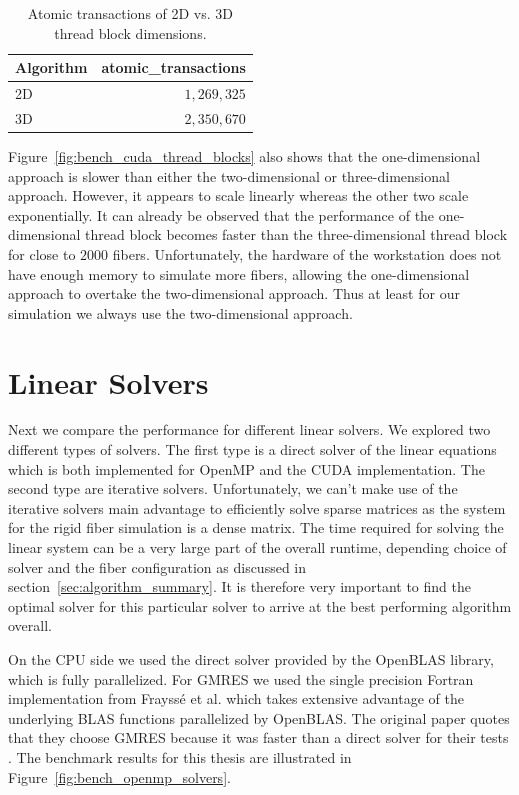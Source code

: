 \documentclass[a4paper,11pt]{kth-mag}
\begin{document}
\begin{table}[!htbp]
  \begin{center}
    \begin{tabulary}{0.7\textwidth}{LR}
      \toprule
      Algorithm & atomic\_transactions \\
      \midrule
      2D & $1,269,325$ \\
      3D & $2,350,670$ \\
      \bottomrule
    \end{tabulary}
  \end{center}
  \caption{Atomic transactions of 2D vs. 3D thread block dimensions.}
  \label{tab:atomic_transactions}
\end{table}

Figure~\ref{fig:bench_cuda_thread_blocks} also shows that the one-dimensional approach is slower than either the two-dimensional or three-dimensional approach. However, it appears to scale linearly whereas the other two scale exponentially. It can already be observed that the performance of the one-dimensional thread block becomes faster than the three-dimensional thread block for close to $2000$ fibers. Unfortunately, the hardware of the workstation does not have enough memory to simulate more fibers, allowing the one-dimensional approach to overtake the two-dimensional approach. Thus at least for our simulation we always use the two-dimensional approach.

\section{Linear Solvers}
\label{sec:bench_linear_solvers}

Next we compare the performance for different linear solvers. We explored two different types of solvers. The first type is a direct solver of the linear equations which is both implemented for OpenMP and the CUDA implementation. The second type are iterative solvers. Unfortunately, we can't make use of the iterative solvers main advantage to efficiently solve sparse matrices as the system for the rigid fiber simulation is a dense matrix. The time required for solving the linear system can be a very large part of the overall runtime, depending choice of solver and the fiber configuration as discussed in section~\ref{sec:algorithm_summary}. It is therefore very important to find the optimal solver for this particular solver to arrive at the best performing algorithm overall.

On the CPU side we used the direct solver provided by the OpenBLAS library, which is fully parallelized. For GMRES we used the single precision Fortran implementation from Frayssé et al. \cite{Fraysse2003} which takes extensive advantage of the underlying BLAS functions parallelized by OpenBLAS. The original paper quotes that they choose GMRES because it was faster than a direct solver for their tests \cite{Tornberg2006}. The benchmark results for this thesis are illustrated in Figure~\ref{fig:bench_openmp_solvers}.
\end{document}
